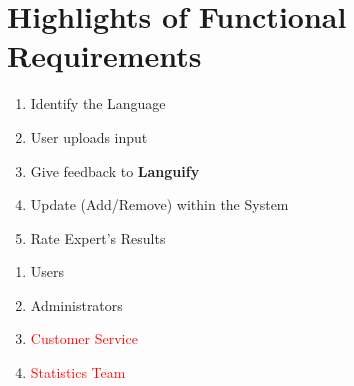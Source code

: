 \section{Highlights of Functional Requirements}
\label{sec:functional_requirements}


\begin{enumerate}[{\bf BE}1:]
	\item Identify the Language
	\item User uploads input	
	\item Give feedback to \textbf{Languify}
	\item Update (Add/Remove)  within the System
	\item Rate Expert's Results
\end{enumerate}

\begin{enumerate}[{\bf VP}1:]
	\item Users
	\item Administrators
	\item \textcolor{red}{Customer Service}
	\item \textcolor{red}{Statistics Team}
\end{enumerate}



\begin{enumerate}[{\bf BE1:}]


	
	

	

	

	


	


	
\end{enumerate}